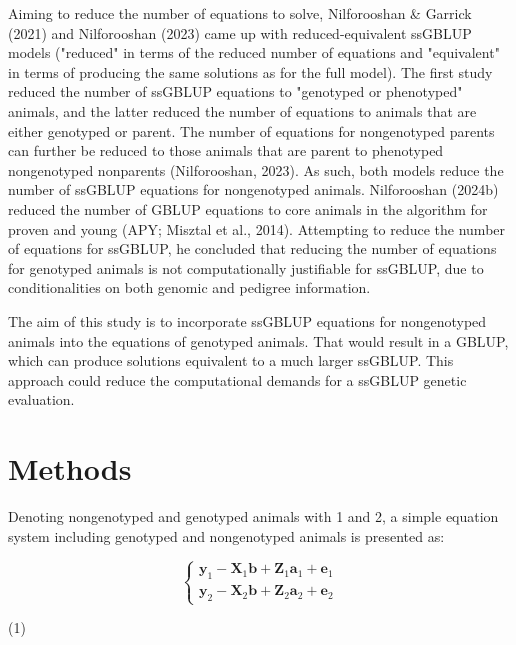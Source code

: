\documentclass[authordate, empirical]{jote-new-article}
\begin{document}
	Aiming to reduce the number of equations to solve, Nilforooshan \& Garrick (2021) and Nilforooshan (2023) came up with reduced-equivalent ssGBLUP models ("reduced" in terms of the reduced number of equations and "equivalent" in terms of producing the same solutions as for the full model). The first study reduced the number of ssGBLUP equations to "genotyped or phenotyped" animals, and the latter reduced the number of equations to animals that are either genotyped or parent. The number of equations for nongenotyped parents can further be reduced to those animals that are parent to phenotyped nongenotyped nonparents (Nilforooshan, 2023). As such, both models reduce the number of ssGBLUP equations for nongenotyped animals. Nilforooshan (2024b) reduced the number of GBLUP equations to core animals in the algorithm for proven and young (APY; Misztal et al., 2014). Attempting to reduce the number of equations for ssGBLUP, he concluded that reducing the number of equations for genotyped animals is not computationally justifiable for ssGBLUP, due to conditionalities on both genomic and pedigree information.



	The aim of this study is to incorporate ssGBLUP equations for nongenotyped animals into the equations of genotyped animals. That would result in a GBLUP, which can produce solutions equivalent to a much larger ssGBLUP. This approach could reduce the computational demands for a ssGBLUP genetic evaluation.



	\section{Methods}



	Denoting nongenotyped and genotyped animals with 1 and 2, a simple equation system including genotyped and nongenotyped animals is presented as:



	\begin{equation*}
		\begin{cases}
		\textbf{y}_1-\textbf{X}_1\textbf{b}+\textbf{Z}_1\textbf{a}_1+\textbf{e}_1\\
		\textbf{y}_2-\textbf{X}_2\textbf{b}+\textbf{Z}_2\textbf{a}_2+\textbf{e}_2
		\end{cases}
	\end{equation*}

\vspace{-1.5\baselineskip}
\begin{center}
		(1)
	\end{center}
\end{document}
